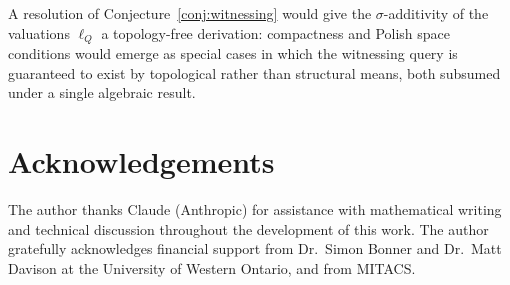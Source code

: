 \documentclass[12pt]{article}
\theoremstyle{definition}
\theoremstyle{remark}
\begin{document}
A resolution of Conjecture~\ref{conj:witnessing} would give the $\sigma$-additivity
of the valuations $\ell_Q$ a topology-free derivation: compactness and Polish space
conditions would emerge as special cases in which the witnessing query is guaranteed
to exist by topological rather than structural means, both subsumed under a single
algebraic result.




\section*{Acknowledgements}

The author thanks Claude (Anthropic) for assistance with mathematical writing and
technical discussion throughout the development of this work.  The author gratefully
acknowledges financial support from Dr.\ Simon Bonner and Dr.\ Matt Davison at the
University of Western Ontario, and from MITACS.
\end{document}
